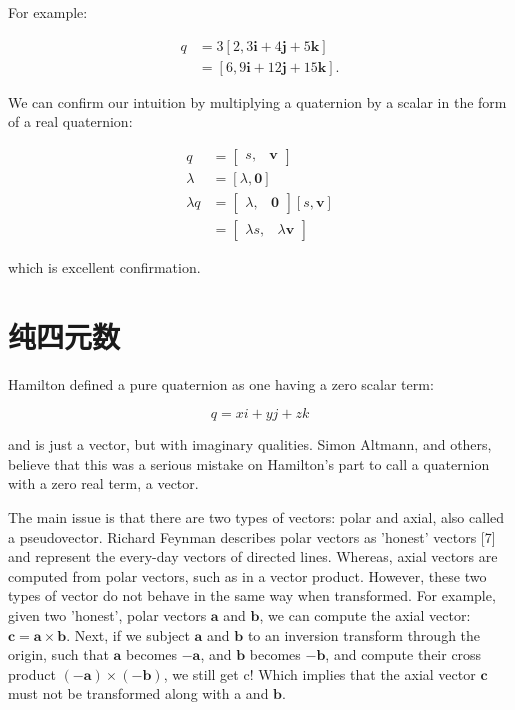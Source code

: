 For example:

$$
    \begin{aligned}
        q & =3[2,3 \mathbf{i}+4 \mathbf{j}+5 \mathbf{k}]    \\
          & =[6,9 \mathbf{i}+12 \mathbf{j}+15 \mathbf{k}] .
    \end{aligned}
$$

We can confirm our intuition by multiplying a quaternion by a scalar in the form of a real quaternion:

$$
    \begin{aligned}
        q         & =\left[\begin{array}{ll}
                s, & \mathbf{v}
            \end{array}\right]                \\
        \lambda   & =[\lambda, \mathbf{0}]                                  \\
        \lambda q & =\left[\begin{array}{ll}
                \lambda, & \mathbf{0}
            \end{array}\right][s, \mathbf{v}] \\
                  & =\left[\begin{array}{ll}
                \lambda s, & \lambda \mathbf{v}
            \end{array}\right]
    \end{aligned}
$$

which is excellent confirmation.

\section{纯四元数}
Hamilton defined a pure quaternion as one having a zero scalar term:

$$
    q=x i+y j+z k
$$

and is just a vector, but with imaginary qualities. Simon Altmann, and others, believe that this was a serious mistake on Hamilton's part to call a quaternion with a zero real term, a vector.

The main issue is that there are two types of vectors: polar and axial, also called a pseudovector. Richard Feynman describes polar vectors as 'honest' vectors [7] and represent the every-day vectors of directed lines. Whereas, axial vectors are computed from polar vectors, such as in a vector product. However, these two types of vector do not behave in the same way when transformed. For example, given two 'honest', polar vectors $\mathbf{a}$ and $\mathbf{b}$, we can compute the axial vector: $\mathbf{c}=\mathbf{a} \times \mathbf{b}$. Next, if we subject $\mathbf{a}$ and $\mathbf{b}$ to an inversion transform through the origin, such that $\mathbf{a}$ becomes $-\mathbf{a}$, and $\mathbf{b}$ becomes $-\mathbf{b}$, and compute their cross product $(-\mathbf{a}) \times(-\mathbf{b})$, we still get c! Which implies that the axial vector $\mathbf{c}$ must not be transformed along with a and $\mathbf{b}$.

